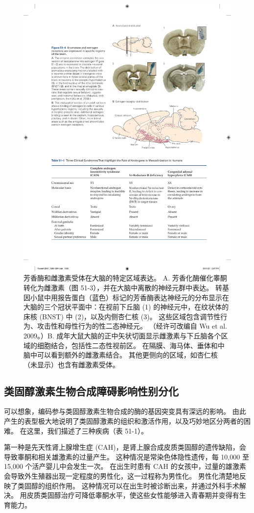 \begin{figure}[htbp]
	\centering
	\includegraphics[width=0.7\linewidth]{chap51/fig_51_4}
	\caption{芳香酶和雌激素受体在大脑的特定区域表达。 A. 芳香化酶催化睾酮转化为雌激素（图 51-3），并在大脑中离散的神经元群中表达。 转基因小鼠中用报告蛋白（蓝色）标记的芳香酶表达神经元的分布显示在大脑的三个冠状平面中：在视前下丘脑 (1) 的神经元中，在纹状体的床核 (BNST) 中 (2)，以及内侧杏仁核 (3)。 这些区域包含调节性行为、攻击性和母性行为的性二态神经元。 （经许可改编自 Wu et al. 2009。）B. 成年大鼠大脑的正中矢状切面显示雌激素与下丘脑各个区域的细胞结合，包括性二态性视前区。 在隔膜、海马体、垂体和中脑中可以看到额外的雌激素结合。 其他更侧向的区域，如杏仁核（未显示）也含有雌激素受体。}
	\label{fig:51_4}
\end{figure}


\subsection{类固醇激素生物合成障碍影响性别分化}

可以想象，编码参与类固醇激素生物合成的酶的基因突变具有深远的影响。 由此产生的表型极大地说明了类固醇激素的组织和激活作用，以及巧妙地区分两者的困难。 在这里，我们描述了三种疾病（表 51-1）。

第一种是先天性肾上腺增生症 (CAH)，是肾上腺合成皮质类固醇的遗传缺陷，会导致睾酮和相关雄激素的过量产生。 这种情况是常染色体隐性遗传，每 10,000 至 15,000 个活产婴儿中会发生一次。 在出生时患有 CAH 的女孩中，过量的雄激素会导致外生殖器出现一定程度的男性化，这一过程称为男性化。 男性化清楚地反映了类固醇的组织作用。 这种情况可以在出生时被诊断出来，并通过外科手术解决。 用皮质类固醇治疗可降低睾酮水平，使这些女性能够进入青春期并变得有生育能力。

